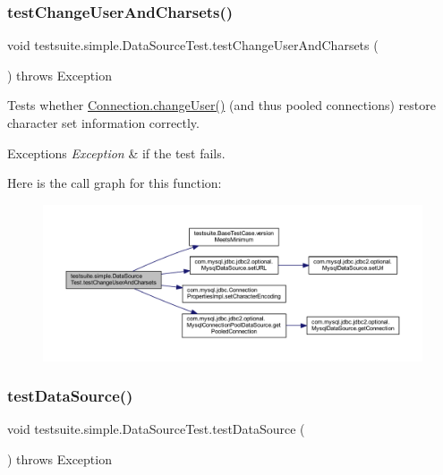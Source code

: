 \subsubsection{\texorpdfstring{test\+Change\+User\+And\+Charsets()}{testChangeUserAndCharsets()}}
{\footnotesize\ttfamily void testsuite.\+simple.\+Data\+Source\+Test.\+test\+Change\+User\+And\+Charsets (\begin{DoxyParamCaption}{ }\end{DoxyParamCaption}) throws Exception}

Tests whether \mbox{\hyperlink{interfacecom_1_1mysql_1_1jdbc_1_1_connection_a6a6160ecb2c19b5f246450ba9252907d}{Connection.\+change\+User()}} (and thus pooled connections) restore character set information correctly.


\begin{DoxyExceptions}{Exceptions}
{\em Exception} & if the test fails. \\
\hline
\end{DoxyExceptions}
Here is the call graph for this function\+:
\nopagebreak
\begin{figure}[H]
\begin{center}
\leavevmode
\includegraphics[width=350pt]{classtestsuite_1_1simple_1_1_data_source_test_a238136c42e16d78196d3a6104c43cce5_cgraph}
\end{center}
\end{figure}
\mbox{\label{classtestsuite_1_1simple_1_1_data_source_test_aceabb67c36b42514892dc1a6a38eae1f}} 
\subsubsection{\texorpdfstring{test\+Data\+Source()}{testDataSource()}}
{\footnotesize\ttfamily void testsuite.\+simple.\+Data\+Source\+Test.\+test\+Data\+Source (\begin{DoxyParamCaption}{ }\end{DoxyParamCaption}) throws Exception}


